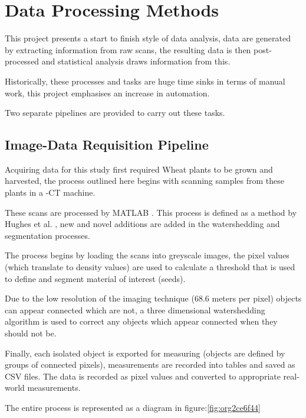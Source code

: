 \documentclass[11pt]{report}
\begin{document}
\section{Data Processing Methods}
\label{sec:org95b4dd4}
This project presents a start to finish style of data analysis, data are generated by extracting information from raw scans, the resulting data is then post-processed and statistical analysis draws information from this.

Historically, these processes and tasks are huge time sinks in terms of manual work, this project emphasises an increase in automation.

Two separate pipelines are provided to carry out these tasks.

\subsection{Image-Data Requisition Pipeline}
\label{sec:org45b3e4b}

Acquiring data for this study first required Wheat plants to be grown and harvested, the process outlined here begins with scanning samples from these plants in a \textmu{}-CT machine.

These scans are processed by MATLAB \cite{MATHWORKS2017}. This process is defined as a method by Hughes et al. \cite{Hughes2017}, new and novel additions are added in the watershedding and segmentation processes.

The process begins by loading the scans into greyscale images, the pixel values (which translate to density values) are used to calculate a threshold that is used to define and segment material of interest (seeds).

Due to the low resolution of the imaging technique (68.6\textmu{} meters per pixel) objects can appear connected which are not, a three dimensional watershedding algorithm is used to correct any objects which appear connected when they should not be.

Finally, each isolated object is exported for measuring (objects are defined by groups of connected pixels), measurements are recorded into tables and saved as CSV files. The data is recorded as pixel values and converted to appropriate real-world measurements.

The entire process is represented as a diagram in figure:\ref{fig:org2ce6f44}
\end{document}
